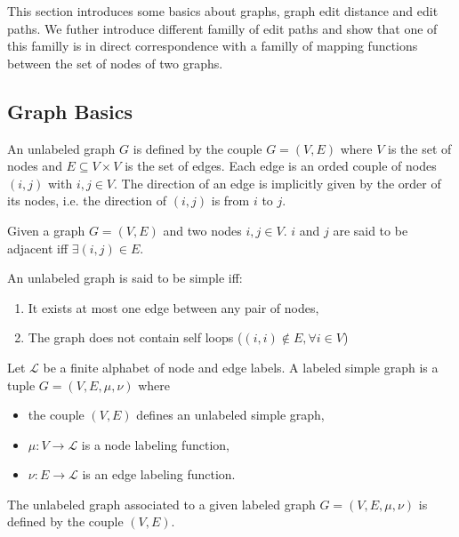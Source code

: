 This section introduces some basics about graphs, graph edit distance
and edit paths. We futher introduce different familly of edit paths
and show that one of this familly is in direct correspondence with a
familly of mapping functions between the set of nodes of two graphs.
\subsection{Graph Basics}\label{sec:mainDef}
\begin{definition}
  An unlabeled  graph $G$ is defined by the couple
  $G=(V,E)$ where $V$ is the set of nodes and $E\subseteq
  V\times V$ is the set of edges. Each edge is an orded couple
  of nodes $(i,j)$ with $i,j \in V$. The direction of an edge is
  implicitly given by the order of its nodes, 
  i.e. the direction of $(i,j)$ is from $i$ to $j$.
\end{definition}
\begin{definition}
Given a graph $G=(V,E)$ and two nodes $i,j \in V$. $i$ and $j$ are
  said to be adjacent iff $\exists (i,j) \in E$.
\end{definition}
\begin{definition}
  An unlabeled graph is said to be simple iff:
  \begin{enumerate}
  \item It exists at most one edge between any pair of nodes,
  \item The graph does not contain self loops
    ($(i,i)\not\in E, \forall i \in V$)
  \end{enumerate}
\end{definition}
\begin{definition}\label{def:labeledsimplegraph}
  Let $\mathcal{L}$ be a finite alphabet of node and edge labels. A
  labeled simple graph  is a tuple $G=(V,E,\mu,\nu)$ where 
  \begin{itemize}
  \item the couple $(V,E)$ defines an unlabeled simple graph,
  \item $\mu : V \rightarrow \mathcal{L}$ is a node labeling function,
  \item $\nu : E\rightarrow \mathcal{L}$ is an edge labeling function.
  \end{itemize}
  The unlabeled graph associated to a given labeled graph
  $G=(V,E,\mu,\nu)$ is defined by the couple $(V,E)$.
\end{definition}


